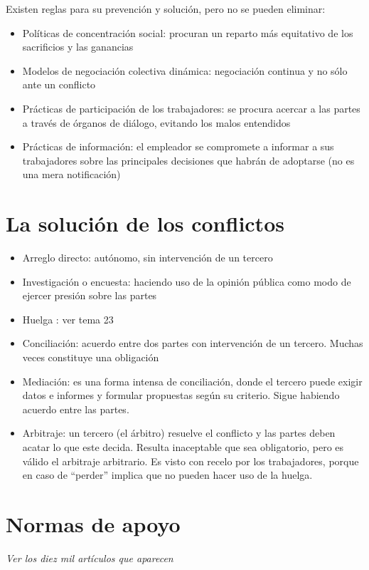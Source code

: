 \documentclass[spanish,12pt,a4paper,titlepage]{report}
\begin{document}
 Existen reglas para su prevención y solución, pero no se pueden eliminar:
\begin{itemize}
\item Políticas de concentración social: procuran un reparto más equitativo de los sacrificios y las ganancias
\item Modelos de negociación colectiva dinámica: negociación continua y no sólo ante un conflicto
\item Prácticas de participación de los trabajadores: se procura acercar a las partes a través de órganos de diálogo, evitando los malos entendidos
\item Prácticas de información: el empleador se compromete a informar a sus trabajadores sobre las principales decisiones que habrán de adoptarse (no es una mera notificación)
\end{itemize}

\section{La solución de los conflictos}
\label{sec:solucion-de-los-conflictos}

\begin{itemize}
\item Arreglo directo: autónomo, sin intervención de un tercero
\item Investigación o encuesta: haciendo uso de la opinión pública como modo de ejercer presión sobre las partes
\item Huelga : ver tema 23
\item Conciliación: acuerdo entre dos partes con intervención de un tercero. Muchas veces constituye una obligación
\item Mediación: es una forma intensa de conciliación, donde el tercero puede exigir datos e informes y formular propuestas según su criterio. Sigue habiendo acuerdo entre las partes.
\item Arbitraje: un tercero (el árbitro) resuelve el conflicto y las partes deben acatar lo que este decida. Resulta inaceptable que sea obligatorio, pero es válido el arbitraje arbitrario. Es visto con recelo por los trabajadores, porque en caso de ``perder'' implica que no pueden hacer uso de la huelga.
\end{itemize}

\section{Normas de apoyo}
\textit {Ver los diez mil artículos que aparecen}
\end{document}
